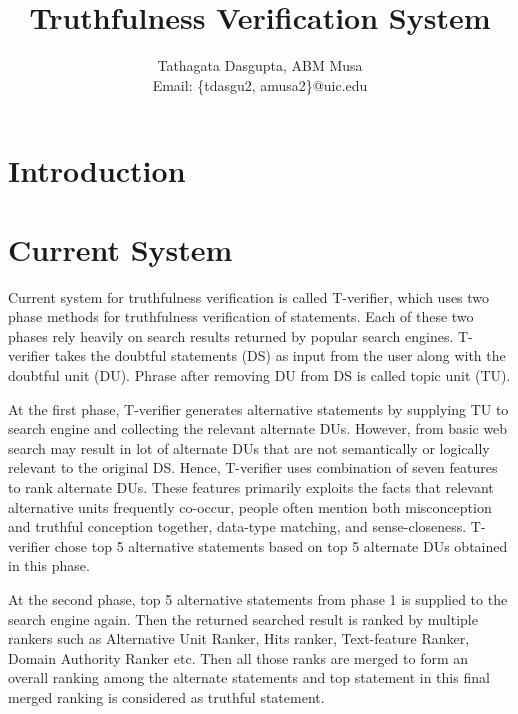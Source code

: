 \documentclass[11pt]{article}
\begin{document}
\title{Truthfulness Verification System}

\author{
Tathagata Dasgupta, ABM Musa\\
Email: \{tdasgu2, amusa2\}@uic.edu
}

\date{}
\maketitle


\section{Introduction}



\section{Current System}
Current system for truthfulness verification is called T-verifier, which uses two phase methods for truthfulness verification of statements. Each of these two phases rely heavily on search results returned by popular search engines. T-verifier takes the doubtful statements (DS) as input from the user along with the doubtful unit (DU). Phrase after removing DU from DS is called topic unit (TU).

At the first phase, T-verifier generates alternative statements by supplying TU to search engine and collecting the relevant alternate DUs. However, from basic web search may result in lot of alternate DUs that are not semantically or logically relevant to the original DS. Hence, T-verifier uses combination of seven features to rank alternate DUs. These features primarily exploits the facts that relevant alternative units frequently co-occur, people often mention both misconception and truthful conception together, data-type matching, and sense-closeness. T-verifier chose top 5 alternative statements based on top 5 alternate DUs obtained in this phase. 

At the second phase, top 5 alternative statements from phase 1 is supplied to the search engine again. Then the returned searched result is ranked by multiple rankers such as Alternative Unit Ranker, Hits ranker, Text-feature Ranker, Domain Authority Ranker etc. Then all those ranks are merged to form an overall ranking among the alternate statements and top statement in this final merged ranking is considered as truthful statement. 

%
%
%
\end{document}
